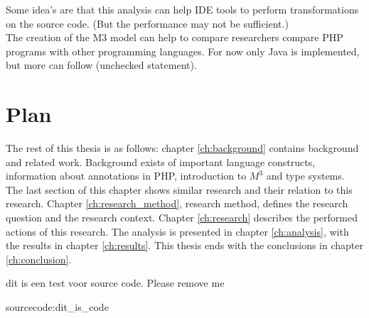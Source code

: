 \documentclass[../main.tex]{subfiles}
\begin{document}
        Some idea's are that this analysis can help IDE tools to perform transformations on the source code.
        (But the performance may not be sufficient.)
        \\
        The creation of the M3 model can help to compare researchers compare PHP programs with other programming languages. For now only Java is implemented, but more can follow (unchecked statement).
    
    \section{Plan} %
        The rest of this thesis is as follows:
        chapter \ref{ch:background} contains background and related work.
        Background exists of important language constructs, information about annotations in PHP, introduction to $M^3$ and type systems. 
        The last section of this chapter shows similar research and their relation to this research.
        Chapter \ref{ch:research_method}, research method, defines the research question and the research context.
        Chapter \ref{ch:research} describes the performed actions of this research. 
        The analysis is presented in chapter \ref{ch:analysis}, with the results in chapter \ref{ch:results}.
        This thesis ends with the conclusions in chapter \ref{ch:conclusion}.
        
        
    \begin{sourcecode}
    dit is een test voor source code. Please remove me %
    \caption{sourcecode:dit_is_code}
    \end{sourcecode}
    
        
\end{document}
